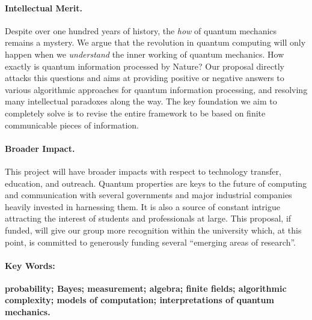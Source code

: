 \documentclass[11pt]{article}
\begin{document}
\paragraph*{Intellectual Merit.} Despite over one hundred years of
history, the \emph{how} of quantum mechanics remains a mystery. We
argue that the revolution in quantum computing will only happen when
we \emph{understand} the inner working of quantum mechanics. How
exactly is quantum information processed by Nature? Our proposal
directly attacks this questions and aims at providing positive or
negative answers to various algorithmic approaches for quantum
information processing, and resolving many intellectual paradoxes
along the way. The key foundation we aim to completely solve is to
revise the entire framework to be based on finite communicable pieces
of information.

\paragraph*{Broader Impact.} This project will have broader impacts
with respect to technology transfer, education, and outreach. Quantum
properties are keys to the future of computing and communication with
several governments and major industrial companies heavily invested in
harnessing them. It is also a source of constant intrigue attracting
the interest of students and professionals at large. This proposal, if
funded, will give our group more recognition within the university
which, at this point, is committed to generously funding several
``emerging areas of research''. 

\paragraph*{Key Words:} \textbf{probability; Bayes; measurement;
  algebra; finite fields; algorithmic complexity; models of
  computation; interpretations of quantum mechanics.}
\end{document}
